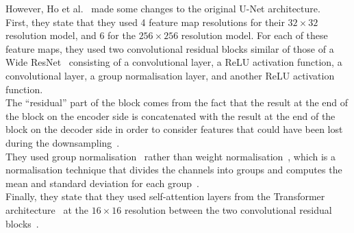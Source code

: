\documentclass[twoside]{article}
\numberwithin{equation}{section}
\numberwithin{figure}{section}
\begin{document}
However, Ho et al.~\cite{ho2020denoising} made some changes to the original U-Net architecture. \\
First, they state that they used 4 feature map resolutions for their $32 \times 32$ resolution model, and 6 for the $256 \times 256$ resolution model. For each of these feature maps, they used two convolutional residual blocks similar of those of a Wide ResNet~\cite{zagoruyko2017wide} consisting of a convolutional layer, a ReLU activation function, a convolutional layer, a group normalisation layer, and another ReLU activation function. \\ 
The ``residual'' part of the block comes from the fact that the result at the end of the block on the encoder side is concatenated with the result at the end of the block on the decoder side in order to consider features that could have been lost during the downsampling~\cite{lai2022rethinking}. \\
They used group normalisation~\cite{wu2018group} rather than weight normalisation~\cite{salimans2016weight}, which is a normalisation technique that divides the channels into groups and computes the mean and standard deviation for each group~\cite{ho2020denoising}. \\
Finally, they state that they used self-attention layers from the Transformer architecture~\cite{vaswani2023attention} at the $16 \times 16$ resolution between the two convolutional residual blocks~\cite{ho2020denoising}.
\end{document}
